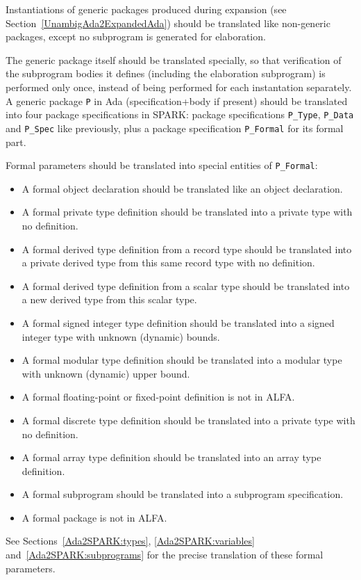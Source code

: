 \documentclass{article}
\begin{document}
Instantiations of generic packages produced during expansion (see
Section~\ref{UnambigAda2ExpandedAda}) should be translated like non-generic
packages, except no subprogram is generated for elaboration.

The generic package itself should be translated specially, so that verification
of the subprogram bodies it defines (including the elaboration subprogram) is
performed only once, instead of being performed for each instantation
separately. A generic package \verb|P| in Ada (specification+body if present)
should be translated into four package specifications in SPARK: package
specifications \verb|P_Type|, \verb|P_Data| and \verb|P_Spec| like previously,
plus a package specification \verb|P_Formal| for its formal part.

Formal parameters should be translated into special entities of
\verb|P_Formal|:
\begin{itemize}
\item A formal object declaration should be translated like an object
  declaration.
\item A formal private type definition should be translated into a private type
  with no definition.
\item A formal derived type definition from a record type should be translated
  into a private derived type from this same record type with no definition.
\item A formal derived type definition from a scalar type should be translated
  into a new derived type from this scalar type.
\item A formal signed integer type definition should be translated into a
  signed integer type with unknown (dynamic) bounds.
\item A formal modular type definition should be translated into a modular type
  with unknown (dynamic) upper bound.
\item A formal floating-point or fixed-point definition is not in ALFA.
\item A formal discrete type definition should be translated into a private
  type with no definition.
\item A formal array type definition should be translated into an array type
  definition.
\item A formal subprogram should be translated into a subprogram specification.
\item A formal package is not in ALFA.
\end{itemize}

See Sections~\ref{Ada2SPARK:types}, \ref{Ada2SPARK:variables}
and~\ref{Ada2SPARK:subprograms} for the precise translation of these formal
parameters.
\end{document}
